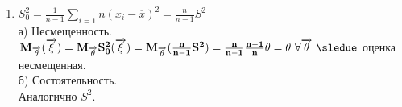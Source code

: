 \begin{proofs}
\begin{dokvo}
\begin{enumerate}
        \item $S_0^2 = \frac{1}{n-1}\sum\limits_{i=1}n(x_i-\overline{x})^2 = \frac{n}{n-1}S^2$\\
        а) Несмещенность.\\
        $\bf{M}_{\overrightarrow{\theta}}(\overrightarrow{\xi}) = \bf{M}_{\overrightarrow{\theta}}S_0^2(\overrightarrow{\xi}) =
        \bf{M}_{\overrightarrow{\theta}}(\frac{n}{n-1}S^2) = \frac{n}{n-1}\frac{n-1}{n}\theta = \theta \ \forall \overrightarrow{\theta} \ \sledue$
        оценка несмещенная.\\
        б) Состоятельность.\\
        Аналогично $S^2$.


      \end{enumerate}
  \end{dokvo}
\end{proofs}
\newpage
